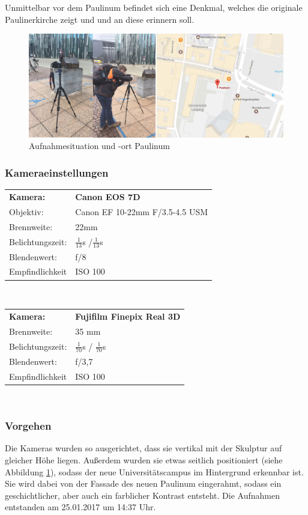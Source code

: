 \documentclass[liststotoc,bibtotoc,fontsize=14pt,]{scrreprt}
\begin{document}
		\bigskip
		Unmittelbar vor dem Paulinum befindet sich eine Denkmal, welches die originale Paulinerkirche zeigt und und an diese erinnern soll.
		
		\begin{figure}[H]
			\includegraphics[width=\linewidth]{img/places/paulinum.jpg}
			\caption{Aufnahmesituation und -ort Paulinum}
			\label{img:paulinum_map}
		\end{figure}

		\subsubsection{Kameraeinstellungen}
				\begin{tabular}{ll}
					\textbf{Kamera:} &\textbf{Canon EOS 7D} \\
					Objektiv: &Canon EF 10-22mm F/3.5-4.5 USM\\		
					Brennweite:& 22mm \\
					Belichtungszeit: & $\frac{1}{13}$s /$\frac{1}{13}$s\\
					Blendenwert: & f/8\\
					Empfindlichkeit & ISO 100 \\
				\end{tabular}\\
				
				\begin{tabular}{ll}
					\textbf{Kamera:} &\textbf{Fujifilm Finepix Real 3D} \\
					Brennweite:& 35 mm \\
					Belichtungszeit: & $\frac{1}{70}$s / $\frac{1}{70}$s\\
					Blendenwert: & f/3,7\\
					Empfindlichkeit & ISO 100 \\
				\end{tabular}\\


	\subsubsection{Vorgehen}
	Die Kameras wurden so ausgerichtet, dass sie vertikal mit der Skulptur auf gleicher Höhe liegen. Außerdem wurden sie etwas seitlich positioniert (siehe Abbildung \ref{img:paulinum_map}), sodass der neue Universitätscampus im Hintergrund erkennbar ist. Sie wird dabei von der Fassade des neuen Paulinum eingerahmt, sodass ein geschichtlicher, aber auch ein farblicher Kontrast entsteht. Die Aufnahmen entstanden am 25.01.2017 um 14:37 Uhr. 
	
\end{document}
